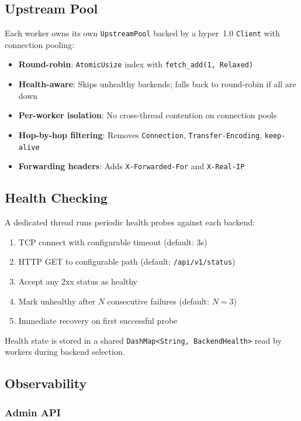 \documentclass[11pt,a4paper,twocolumn]{article}
\begin{document}
\subsection{Upstream Pool}

Each worker owns its own \texttt{UpstreamPool} backed by a hyper~1.0 \texttt{Client} with connection pooling:

\begin{itemize}[nosep]
\item \textbf{Round-robin}: \texttt{AtomicUsize} index with \texttt{fetch\_add(1, Relaxed)}
\item \textbf{Health-aware}: Skips unhealthy backends; falls back to round-robin if all are down
\item \textbf{Per-worker isolation}: No cross-thread contention on connection pools
\item \textbf{Hop-by-hop filtering}: Removes \texttt{Connection}, \texttt{Transfer-Encoding}, \texttt{keep-alive}
\item \textbf{Forwarding headers}: Adds \texttt{X-Forwarded-For} and \texttt{X-Real-IP}
\end{itemize}

\subsection{Health Checking}

A dedicated thread runs periodic health probes against each backend:

\begin{enumerate}[nosep]
\item TCP connect with configurable timeout (default: 3s)
\item HTTP GET to configurable path (default: \texttt{/api/v1/status})
\item Accept any 2xx status as healthy
\item Mark unhealthy after $N$ consecutive failures (default: $N=3$)
\item Immediate recovery on first successful probe
\end{enumerate}

Health state is stored in a shared \texttt{DashMap<String, BackendHealth>} read by workers during backend selection.

\subsection{Observability}

\subsubsection{Admin API}
\end{document}

